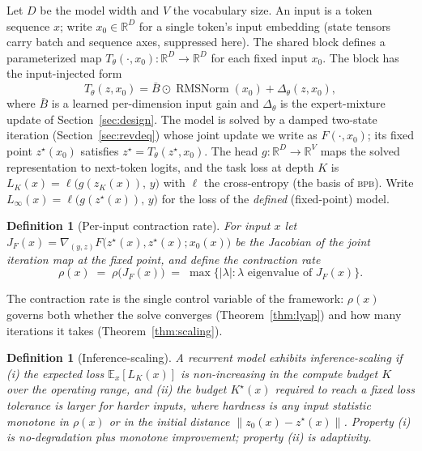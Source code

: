 \documentclass[11pt]{article}
\newtheorem{definition}[theorem]{Definition}
\newcommand{\R}{\mathbb{R}}
\newcommand{\E}{\mathbb{E}}
\newcommand{\RMSNorm}{\operatorname{RMSNorm}}
\newcommand{\bpb}{\textsc{bpb}}
\begin{document}
Let $D$ be the model width and $V$ the vocabulary size.  An input is a token sequence
$x$; write $x_0\in\R^{D}$ for a single token's input embedding (state tensors carry
batch and sequence axes, suppressed here).  The shared block defines a parameterized
map $T_\theta(\cdot, x_0):\R^{D}\to\R^{D}$ for each fixed input $x_0$.  The block has
the input-injected form
\begin{equation}
  T_\theta(z, x_0) = \bar B \odot \RMSNorm(x_0) + \Delta_\theta(z, x_0),
  \label{eq:Tmap}
\end{equation}
where $\bar B$ is a learned per-dimension input gain and $\Delta_\theta$ is the
expert-mixture update of Section~\ref{sec:design}.  The model is solved by a damped
two-state iteration (Section~\ref{sec:revdeq}) whose joint update we write as
$F(\cdot, x_0)$; its fixed point $z^\star(x_0)$ satisfies $z^\star = T_\theta(z^\star, x_0)$.
The head $g:\R^D\to\R^V$ maps the solved representation to next-token logits, and the
task loss at depth $K$ is $L_K(x) = \ell\bigl(g(z_K(x)),\, y\bigr)$ with $\ell$ the
cross-entropy (the basis of \bpb).  Write $L_\infty(x) = \ell\bigl(g(z^\star(x)),\, y\bigr)$
for the loss of the \emph{defined} (fixed-point) model.

\begin{definition}[Per-input contraction rate]
\label{def:rho-x}
For input $x$ let $J_F(x) = \nabla_{(y,z)} F\bigl(z^\star(x), z^\star(x); x_0(x)\bigr)$ be
the Jacobian of the joint iteration map at the fixed point, and define the
\emph{contraction rate}
\[
  \rho(x) \;=\; \rho\bigl(J_F(x)\bigr) \;=\; \max\{|\lambda| : \lambda \text{ eigenvalue of } J_F(x)\}.
\]
\end{definition}

The contraction rate is the single control variable of the framework: $\rho(x)$
governs both whether the solve converges (Theorem~\ref{thm:lyap}) and how many
iterations it takes (Theorem~\ref{thm:scaling}).

\begin{definition}[Inference-scaling]
\label{def:scaling}
A recurrent model \emph{exhibits inference-scaling} if (i) the expected loss
$\E_x[L_K(x)]$ is non-increasing in the compute budget $K$ over the operating range,
and (ii) the budget $K^\star(x)$ required to reach a fixed loss tolerance is larger
for harder inputs, where hardness is any input statistic monotone in $\rho(x)$ or in
the initial distance $\|z_0(x)-z^\star(x)\|$.  Property (i) is \emph{no-degradation
plus monotone improvement}; property (ii) is \emph{adaptivity}.
\end{definition}
\end{document}
